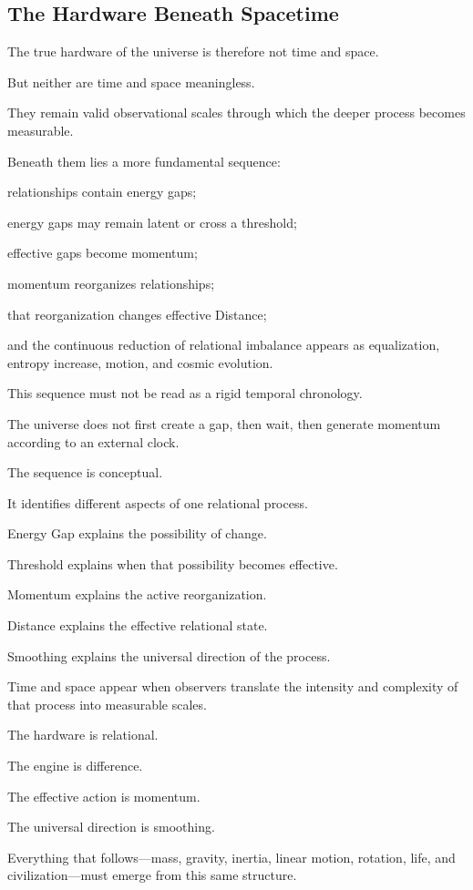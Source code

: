 \subsection*{\textbf{The Hardware Beneath Spacetime}}

The true hardware of the universe is therefore not time and space.

But neither are time and space meaningless.

They remain valid observational scales through which the deeper process becomes measurable.

Beneath them lies a more fundamental sequence:

relationships contain energy gaps;

energy gaps may remain latent or cross a threshold;

effective gaps become momentum;

momentum reorganizes relationships;

that reorganization changes effective Distance;

and the continuous reduction of relational imbalance appears as equalization, entropy increase, motion, and cosmic evolution.

This sequence must not be read as a rigid temporal chronology.

The universe does not first create a gap, then wait, then generate momentum according to an external clock.

The sequence is conceptual.

It identifies different aspects of one relational process.

Energy Gap explains the possibility of change.

Threshold explains when that possibility becomes effective.

Momentum explains the active reorganization.

Distance explains the effective relational state.

Smoothing explains the universal direction of the process.

Time and space appear when observers translate the intensity and complexity of that process into measurable scales.

The hardware is relational.

The engine is difference.

The effective action is momentum.

The universal direction is smoothing.

Everything that follows—mass, gravity, inertia, linear motion, rotation, life, and civilization—must emerge from this same structure.

